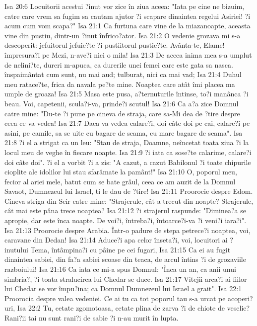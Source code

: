 Isa 20:6  Locuitorii acestui ?inut vor zice în ziua aceea: "Iata pe cine ne bizuim, catre care vrem sa fugim sa cautam ajutor ?i scapare dinaintea regelui Asiriei! ?i acum cum vom scapa?"
Isa 21:1  Ca furtuna care vine de la miazanoapte, aceasta vine din pustiu, dintr-un ?inut înfrico?ator.
Isa 21:2  O vedenie grozava mi s-a descoperit: jefuitorul jefuie?te ?i pustiitorul pustie?te. Avânta-te, Elame! împresura?i pe Mezi, n-ave?i nici o mila!
Isa 21:3  De aceea inima mea s-a umplut de nelini?te, dureri m-apuca, ca durerile unei femei care este gata sa nasca. înspaimântat cum sunt, nu mai aud; tulburat, nici ca mai vad;
Isa 21:4  Duhul meu ratace?te, frica da navala pe?te mine. Noaptea care atât îmi placea ma umple de groaza!
Isa 21:5  Masa este pusa, a?ternuturile întinse, to?i manânca ?i beau. Voi, capetenii, scula?i-va, prinde?i scutul!
Isa 21:6  Ca a?a zice Domnul catre mine: "Du-te ?i pune pe cineva de straja, care sa-Mi dea de ?tire despre ceea ce va vedea!
Isa 21:7  Daca va vedea calare?i, doi câte doi pe cai, calare?i pe asini, pe camile, sa se uite cu bagare de seama, cu mare bagare de seama".
Isa 21:8  ?i el a strigat ca un leu: "Stau de straja, Doamne, neîncetat toata ziua ?i la locul meu de veghe în fiecare noapte.
Isa 21:9  ?i iata ca sose?te calarime, calare?i doi câte doi". ?i el a vorbit ?i a zis: "A cazut, a cazut Babilonul ?i toate chipurile cioplite ale idolilor lui stau sfarâmate la pamânt!"
Isa 21:10  O, poporul meu, fecior al ariei mele, batut cum se bate grâul, ceea ce am auzit de la Domnul Savaot, Dumnezeul lui Israel, ti le dau de ?tire!
Isa 21:11  Proorocie despre Edom. Cineva striga din Seir catre mine: "Strajerule, cât a trecut din noapte? Strajerule, cât mai este pâna trece noaptea?
Isa 21:12  ?i strajerul raspunde: "Diminea?a se apropie, dar este înca noapte. De voi?i, întreba?i, întoarce?i-va ?i veni?i iara?i".
Isa 21:13  Proorocie despre Arabia. Într-o padure de stepa petrece?i noaptea, voi, caravane din Dedan!
Isa 21:14  Aduce?i apa celor înseta?i, voi, locuitori ai ?inutului Tema, întâmpina?i cu pâine pe cei fugari,
Isa 21:15  Ca ei au fugit dinaintea sabiei, din fa?a sabiei scoase din teaca, de arcul întins ?i de grozaviile razboiului!
Isa 21:16  Ca iata ce mi-a spus Domnul: "Înca un an, ca anii unui simbria?, ?i toata stralucirea lui Chedar se duce.
Isa 21:17  Vitejii arca?i ai fiilor lui Chedar se vor împu?ina; ca Domnul Dumnezeul lui Israel a grait".
Isa 22:1  Proorocia despre valea vedeniei. Ce ai tu ca tot poporul tau s-a urcat pe acoperi?uri,
Isa 22:2  Tu, cetate zgomotoasa, cetate plina de zarva ?i de chiote de veselie? Rani?ii tai nu sunt rani?i de sabie ?i n-au murit în lupta.
